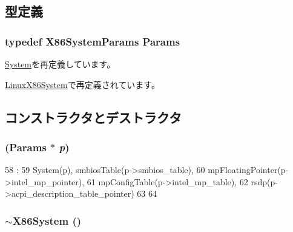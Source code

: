 \subsection{型定義}
\hypertarget{classX86System_a4f3142e3ba81ac1e14e960636ad3202b}{
\subsubsection[{Params}]{\setlength{\rightskip}{0pt plus 5cm}typedef X86SystemParams {\bf Params}}}
\label{classX86System_a4f3142e3ba81ac1e14e960636ad3202b}


\hyperlink{classSystem_a5f461be6222ce76bffcb70f27d820c56}{System}を再定義しています。

\hyperlink{classLinuxX86System_a9a9d4fd080ddd5d649f7db5e47cfae8b}{LinuxX86System}で再定義されています。

\subsection{コンストラクタとデストラクタ}
\hypertarget{classX86System_aa4f02fc2926ae35d549b6b5381b7656f}{
\subsubsection[{X86System}]{ ({\bf Params} $\ast$ {\em p})}}
\label{classX86System_aa4f02fc2926ae35d549b6b5381b7656f}



\begin{DoxyCode}
58                               :
59     System(p), smbiosTable(p->smbios_table),
60     mpFloatingPointer(p->intel_mp_pointer),
61     mpConfigTable(p->intel_mp_table),
62     rsdp(p->acpi_description_table_pointer)
63 {
64 }

\end{DoxyCode}
\hypertarget{classX86System_a0f8dc8b16330d4a51897190c3969e675}{
\subsubsection[{$\sim$X86System}]{\setlength{\rightskip}{0pt plus 5cm}$\sim${\bf X86System} ()}}
\label{classX86System_a0f8dc8b16330d4a51897190c3969e675}



